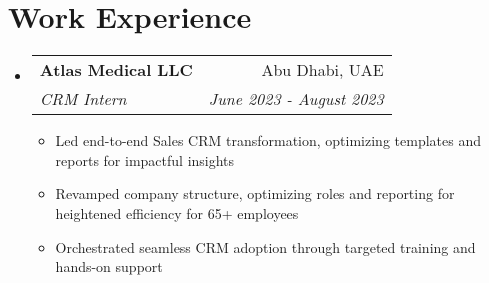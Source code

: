 \documentclass[a4paper,20pt]{article}
\makeatletter
\newcommand{\resumeItemWithoutTitle}[1]{
  \item\small{
	{#1 \vspace{-2pt}}
  }
}
\newcommand{\resumeSubheading}[4]{
  \vspace{-1pt}\item
	\begin{tabular*}{0.97\textwidth}{l@{\extracolsep{\fill}}r}
	  \textbf{#1} & #2 \\
	  \textit{#3} & \textit{#4} \\
	\end{tabular*}\vspace{-5pt}
}
\newcommand{\resumeSubHeadingListStart}{\begin{itemize}[leftmargin=*]}
\newcommand{\resumeSubHeadingListEnd}{\end{itemize}}
\newcommand{\resumeItemListStart}{\begin{itemize}}
\newcommand{\resumeItemListEnd}{\end{itemize}\vspace{-5pt}}
\makeatother
\begin{document}

\vspace{-5pt}
\section{Work Experience}
  \resumeSubHeadingListStart
	\resumeSubheading{Atlas Medical LLC}{Abu Dhabi, UAE} {CRM Intern}{June 2023 - August 2023}
	\resumeItemListStart
		\resumeItemWithoutTitle{Led end-to-end Sales CRM transformation, optimizing templates and reports for impactful insights}
		\resumeItemWithoutTitle{Revamped company structure, optimizing roles and reporting for heightened efficiency for 65+ employees}
		\resumeItemWithoutTitle{Orchestrated seamless CRM adoption through targeted training and hands-on support}
	\resumeItemListEnd
  \resumeSubHeadingListEnd
\end{document}
